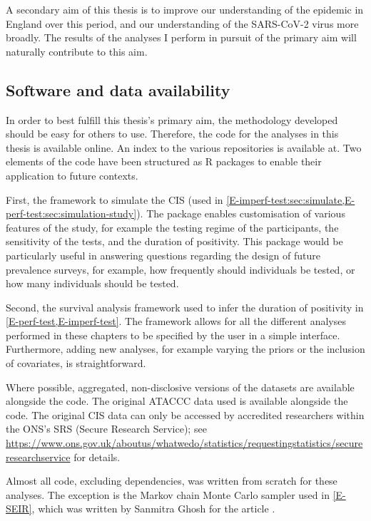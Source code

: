 \documentclass[thesis.tex]{subfiles}
\begin{document}
A secondary aim of this thesis is to improve our understanding of the epidemic in England over this period, and our understanding of the SARS-CoV-2 virus more broadly.
The results of the analyses I perform in pursuit of the primary aim will naturally contribute to this aim.

\subsection{Software and data availability}

In order to best fulfill this thesis's primary aim, the methodology developed should be easy for others to use.
Therefore, the code for the analyses in this thesis is available online.
An index to the various repositories is available at.
Two elements of the code have been structured as R packages to enable their application to future contexts.

First, the framework to simulate the CIS (used in \cref{E-imperf-test:sec:simulate,E-perf-test:sec:simulation-study}).
The package enables customisation of various features of the study, for example the testing regime of the participants, the sensitivity of the tests, and the duration of positivity.
This package would be particularly useful in answering questions regarding the design of future prevalence surveys, for example, how frequently should individuals be tested, or how many individuals should be tested.

Second, the survival analysis framework used to infer the duration of positivity in \cref{E-perf-test,E-imperf-test}.
The framework allows for all the different analyses performed in these chapters to be specified by the user in a simple interface.
Furthermore, adding new analyses, for example varying the priors or the inclusion of covariates, is straightforward.

Where possible, aggregated, non-disclosive versions of the datasets are available alongside the code.
The original ATACCC data used is available alongside the code.
The original CIS data can only be accessed by accredited researchers within the ONS's SRS (Secure Research Service); see \url{https://www.ons.gov.uk/aboutus/whatwedo/statistics/requestingstatistics/secureresearchservice} for details.

Almost all code, excluding dependencies, was written from scratch for these analyses.
The exception is the Markov chain Monte Carlo sampler used in \cref{E-SEIR}, which was written by Sanmitra Ghosh for the article \textcite{ghoshApproximate}.
\end{document}

